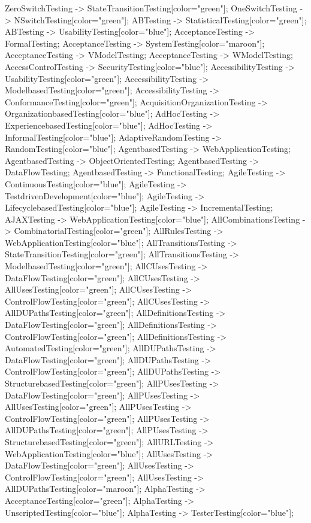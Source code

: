 \documentclass{article}
\begin{document}
{ZeroSwitchTesting -> StateTransitionTesting[color="green"];
OneSwitchTesting -> NSwitchTesting[color="green"];
ABTesting -> StatisticalTesting[color="green"];
ABTesting -> UsabilityTesting[color="blue"];
AcceptanceTesting -> FormalTesting;
AcceptanceTesting -> SystemTesting[color="maroon"];
AcceptanceTesting -> VModelTesting;
AcceptanceTesting -> WModelTesting;
AccessControlTesting -> SecurityTesting[color="blue"];
AccessibilityTesting -> UsabilityTesting[color="green"];
AccessibilityTesting -> ModelbasedTesting[color="green"];
AccessibilityTesting -> ConformanceTesting[color="green"];
AcquisitionOrganizationTesting -> OrganizationbasedTesting[color="blue"];
AdHocTesting -> ExperiencebasedTesting[color="blue"];
AdHocTesting -> InformalTesting[color="blue"];
AdaptiveRandomTesting -> RandomTesting[color="blue"];
AgentbasedTesting -> WebApplicationTesting;
AgentbasedTesting -> ObjectOrientedTesting;
AgentbasedTesting -> DataFlowTesting;
AgentbasedTesting -> FunctionalTesting;
AgileTesting -> ContinuousTesting[color="blue"];
AgileTesting -> TestdrivenDevelopment[color="blue"];
AgileTesting -> LifecyclebasedTesting[color="blue"];
AgileTesting -> IncrementalTesting;
AJAXTesting -> WebApplicationTesting[color="blue"];
AllCombinationsTesting -> CombinatorialTesting[color="green"];
AllRulesTesting -> WebApplicationTesting[color="blue"];
AllTransitionsTesting -> StateTransitionTesting[color="green"];
AllTransitionsTesting -> ModelbasedTesting[color="green"];
AllCUsesTesting -> DataFlowTesting[color="green"];
AllCUsesTesting -> AllUsesTesting[color="green"];
AllCUsesTesting -> ControlFlowTesting[color="green"];
AllCUsesTesting -> AllDUPathsTesting[color="green"];
AllDefinitionsTesting -> DataFlowTesting[color="green"];
AllDefinitionsTesting -> ControlFlowTesting[color="green"];
AllDefinitionsTesting -> AutomatedTesting[color="green"];
AllDUPathsTesting -> DataFlowTesting[color="green"];
AllDUPathsTesting -> ControlFlowTesting[color="green"];
AllDUPathsTesting -> StructurebasedTesting[color="green"];
AllPUsesTesting -> DataFlowTesting[color="green"];
AllPUsesTesting -> AllUsesTesting[color="green"];
AllPUsesTesting -> ControlFlowTesting[color="green"];
AllPUsesTesting -> AllDUPathsTesting[color="green"];
AllPUsesTesting -> StructurebasedTesting[color="green"];
AllURLTesting -> WebApplicationTesting[color="blue"];
AllUsesTesting -> DataFlowTesting[color="green"];
AllUsesTesting -> ControlFlowTesting[color="green"];
AllUsesTesting -> AllDUPathsTesting[color="maroon"];
AlphaTesting -> AcceptanceTesting[color="green"];
AlphaTesting -> UnscriptedTesting[color="blue"];
AlphaTesting -> TesterTesting[color="blue"];
}
\end{document}
